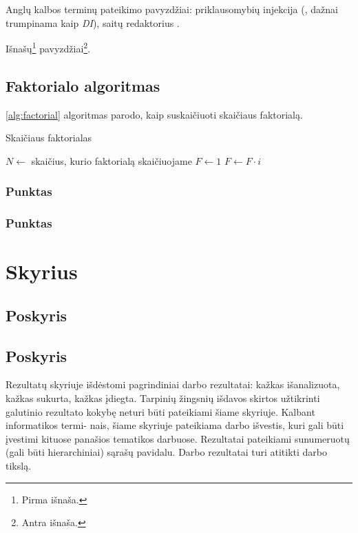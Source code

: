 \documentclass[
]{VUMIFSEMasterThesis}
\begin{document}
Anglų kalbos terminų pateikimo pavyzdžiai: priklausomybių injekcija (,
dažnai trumpinama kaip \textit{DI}), saitų redaktorius .

Išnašų\footnote{Pirma išnaša.} pavyzdžiai\footnote{Antra išnaša.}.

\subsection{Faktorialo algoritmas}

\ref{alg:factorial} algoritmas parodo, kaip suskaičiuoti skaičiaus faktorialą.

\begin{algorithm}
\caption{Skaičiaus faktorialas}
\begin{algorithmic}[1] %
\State $N\gets$ skaičius, kurio faktorialą skaičiuojame
\State $F\gets 1$
    \State $F\gets F \cdot i$
\EndFor
\end{algorithmic}
\label{alg:factorial}
\end{algorithm}

\subsubsection{Punktas}
\subsubsection{Punktas}
\section{Skyrius}
\subsection{Poskyris}
\subsection{Poskyris}

Rezultatų skyriuje išdėstomi pagrindiniai darbo rezultatai: kažkas išanalizuota,
kažkas sukurta, kažkas įdiegta. Tarpinių žingsnių išdavos skirtos užtikrinti galutinio
rezultato kokybę neturi būti pateikiami šiame skyriuje. Kalbant informatikos termi-
nais, šiame skyriuje pateikiama darbo išvestis, kuri gali būti įvestimi kituose panašios
tematikos darbuose. Rezultatai pateikiami sunumeruotų (gali būti hierarchiniai) sąrašų
pavidalu. Darbo rezultatai turi atitikti darbo tikslą.
\end{document}
